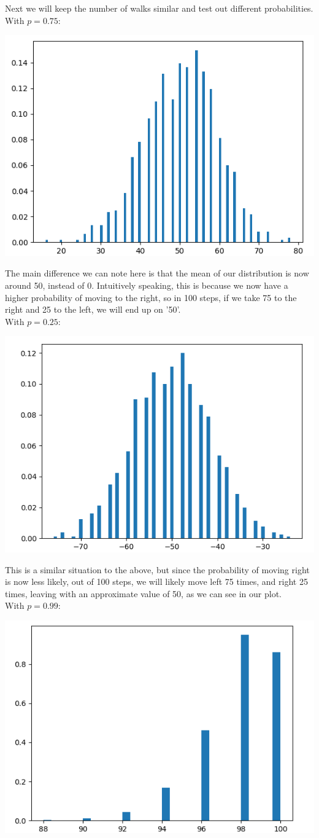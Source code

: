 \documentclass[addpoints]{exam}
\begin{document}
\begin{questions}
Next we will keep the number of walks similar and test out different probabilities.\\
With $p=0.75$:
\begin{center}
\includegraphics[width=.48\textwidth]{images/p1_1_2.png}
\end{center}
The main difference we can note here is that the mean of our distribution is now around 50, instead of 0. Intuitively speaking, this is because we now have a higher probability of moving to the right, so in 100 steps, if we take 75 to the right and 25 to the left, we will end up on '50'.\\
With $p=0.25$:
\begin{center}
\includegraphics[width=.48\textwidth]{images/p1_1_3.png}
\end{center}
This is a similar situation to the above, but since the probability of moving right is now less likely, out of 100 steps, we will likely move left 75 times, and right 25 times, leaving with an approximate value of 50, as we can see in our plot.\\
With $p=0.99$:
\begin{center}
\includegraphics[width=.48\textwidth]{images/p1_1_4.png}
\end{center}


\end{questions}
\end{document}
